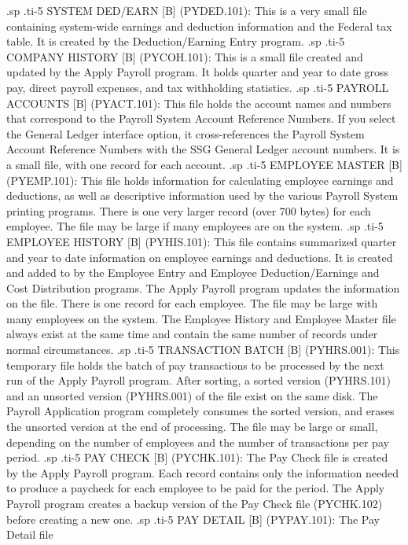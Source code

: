 .sp
.ti-5
SYSTEM DED/EARN [B] (PYDED.101): This is a very
small file containing system-wide
earnings and deduction information and the Federal tax table.  It is
created by the Deduction/Earning Entry program.
.sp
.ti-5
COMPANY HISTORY [B] (PYCOH.101): This is a small file
created and updated by the
Apply Payroll program.	It holds quarter and year to date gross
pay, direct payroll expenses, and tax withholding statistics.
.sp
.ti-5
PAYROLL ACCOUNTS [B] (PYACT.101): This file holds the account
names and numbers that
correspond to the Payroll System Account Reference Numbers.  If you select
the General Ledger interface option, it cross-references the Payroll
System Account Reference Numbers with the SSG General Ledger account
numbers.  It is a small file, with one record for each account.
.sp
.ti-5
EMPLOYEE MASTER [B] (PYEMP.101): This file holds information for calculating
employee earnings and deductions, as well as descriptive information
used by the various Payroll System printing programs.  There is one
very larger record (over 700 bytes) for each employee.	The file may be
large if many employees are on the system.
.sp
.ti-5
EMPLOYEE HISTORY [B] (PYHIS.101): This file contains summarized
quarter and year to
date information on employee earnings and deductions.  It is created and
added to by the Employee Entry and Employee Deduction/Earnings and Cost
Distribution
programs.  The Apply Payroll program updates the information on the
file.  There is one record for each employee.  The file may be large
with many employees on the system. The Employee History and Employee Master
file always exist at the same time and contain the same number of records
under normal circumstances.
.sp
.ti-5
TRANSACTION BATCH [B] (PYHRS.001): This temporary file holds the batch of pay
transactions to be processed by the next run of the Apply Payroll
program.  After sorting, a sorted version (PYHRS.101)
and an unsorted version (PYHRS.001) of the
file exist on the same disk.
The Payroll Application program completely consumes the sorted version, and
erases the unsorted version at the end of processing.
The file may be large or small, depending on the number of
employees and the number of transactions per pay period.
.sp
.ti-5
PAY CHECK [B] (PYCHK.101): The Pay Check file is
created by the Apply Payroll
program.  Each record contains only the information needed to produce a
paycheck for each employee to be paid for the period.  The Apply Payroll
program creates a backup version of the Pay Check
file (PYCHK.102) before creating a new one.
.sp
.ti-5
PAY DETAIL [B] (PYPAY.101): The Pay Detail file
